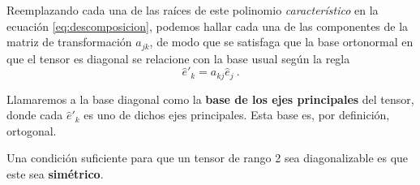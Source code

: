 Reemplazando cada una de las raíces de este polinomio \emph{característico} en la ecuación \eqref{eq:descomposicion}, podemos hallar cada una de las componentes de la matriz de transformación $a_{jk}$, de modo que se satisfaga que la base ortonormal en que el tensor es diagonal se relacione con la base usual según la regla
\begin{equation}
    \hat{e}'_k = a_{kj} \hat{e}_j \ .
\end{equation}

Llamaremos a la base diagonal como la \textbf{base de los ejes principales} del tensor, donde cada $\hat{e}'_k$ es uno de dichos ejes principales. Esta base es, por definición, ortogonal.

Una condición suficiente para que un tensor de rango 2 sea diagonalizable es que este sea \textbf{simétrico}.

